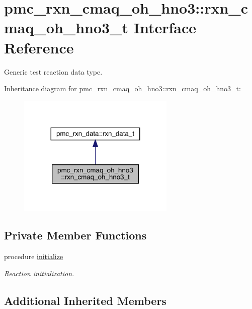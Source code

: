 \hypertarget{structpmc__rxn__cmaq__oh__hno3_1_1rxn__cmaq__oh__hno3__t}{}\section{pmc\+\_\+rxn\+\_\+cmaq\+\_\+oh\+\_\+hno3\+:\+:rxn\+\_\+cmaq\+\_\+oh\+\_\+hno3\+\_\+t Interface Reference}
\label{structpmc__rxn__cmaq__oh__hno3_1_1rxn__cmaq__oh__hno3__t}


Generic test reaction data type.  




Inheritance diagram for pmc\+\_\+rxn\+\_\+cmaq\+\_\+oh\+\_\+hno3\+:\+:rxn\+\_\+cmaq\+\_\+oh\+\_\+hno3\+\_\+t\+:\nopagebreak
\begin{figure}[H]
\begin{center}
\leavevmode
\includegraphics[width=212pt]{structpmc__rxn__cmaq__oh__hno3_1_1rxn__cmaq__oh__hno3__t__inherit__graph}
\end{center}
\end{figure}
\subsection*{Private Member Functions}
\begin{DoxyCompactItemize}
\item 
procedure \mbox{\hyperlink{structpmc__rxn__cmaq__oh__hno3_1_1rxn__cmaq__oh__hno3__t_a10dea984f53fc68f75ad1529061680a5}{initialize}}
\begin{DoxyCompactList}\small\item\em Reaction initialization. \end{DoxyCompactList}\end{DoxyCompactItemize}
\subsection*{Additional Inherited Members}


